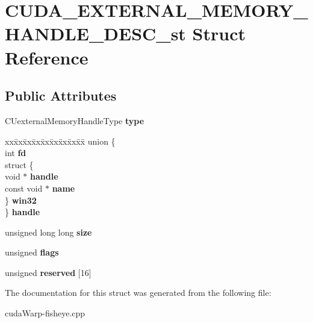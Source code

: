 \hypertarget{structCUDA__EXTERNAL__MEMORY__HANDLE__DESC__st}{}\section{C\+U\+D\+A\+\_\+\+E\+X\+T\+E\+R\+N\+A\+L\+\_\+\+M\+E\+M\+O\+R\+Y\+\_\+\+H\+A\+N\+D\+L\+E\+\_\+\+D\+E\+S\+C\+\_\+st Struct Reference}
\label{structCUDA__EXTERNAL__MEMORY__HANDLE__DESC__st}
\subsection*{Public Attributes}
\begin{DoxyCompactItemize}
\item 
C\+Uexternal\+Memory\+Handle\+Type {\bfseries type}\hypertarget{structCUDA__EXTERNAL__MEMORY__HANDLE__DESC__st_a534a1cf652e812ebe30c62b3ef2092f3}{}\label{structCUDA__EXTERNAL__MEMORY__HANDLE__DESC__st_a534a1cf652e812ebe30c62b3ef2092f3}

\item 
\begin{tabbing}
xx\=xx\=xx\=xx\=xx\=xx\=xx\=xx\=xx\=\kill
union \{\\
\>int {\bfseries fd}\\
\>struct \{\\
\>\>void $\ast$ {\bfseries handle}\\
\>\>const void $\ast$ {\bfseries name}\\
\>\} {\bfseries win32}\\
\} {\bfseries handle}\hypertarget{structCUDA__EXTERNAL__MEMORY__HANDLE__DESC__st_a9309fe214371927b384d10cda61ce2dc}{}\label{structCUDA__EXTERNAL__MEMORY__HANDLE__DESC__st_a9309fe214371927b384d10cda61ce2dc}
\\

\end{tabbing}\item 
unsigned long long {\bfseries size}\hypertarget{structCUDA__EXTERNAL__MEMORY__HANDLE__DESC__st_ad32c28f5e0c000cc941e5c7f70f4dabc}{}\label{structCUDA__EXTERNAL__MEMORY__HANDLE__DESC__st_ad32c28f5e0c000cc941e5c7f70f4dabc}

\item 
unsigned {\bfseries flags}\hypertarget{structCUDA__EXTERNAL__MEMORY__HANDLE__DESC__st_a18f5b434947a30b8f2e9ec805c3475f9}{}\label{structCUDA__EXTERNAL__MEMORY__HANDLE__DESC__st_a18f5b434947a30b8f2e9ec805c3475f9}

\item 
unsigned {\bfseries reserved} \mbox{[}16\mbox{]}\hypertarget{structCUDA__EXTERNAL__MEMORY__HANDLE__DESC__st_a765cbedbb401a69c86c7e8de9535e649}{}\label{structCUDA__EXTERNAL__MEMORY__HANDLE__DESC__st_a765cbedbb401a69c86c7e8de9535e649}

\end{DoxyCompactItemize}


The documentation for this struct was generated from the following file\+:\begin{DoxyCompactItemize}
\item 
cuda\+Warp-\/fisheye.\+cpp\end{DoxyCompactItemize}
